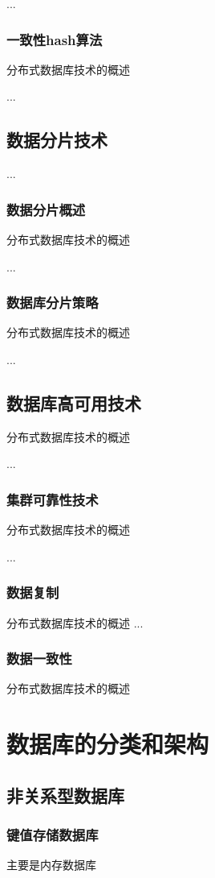 ...
\subsubsection*{一致性hash算法}
分布式数据库技术的概述

...
\subsection*{数据分片技术}
...
\subsubsection*{数据分片概述}
分布式数据库技术的概述

...
\subsubsection*{数据库分片策略}
分布式数据库技术的概述

...
\subsection*{数据库高可用技术}
分布式数据库技术的概述

...
\subsubsection*{集群可靠性技术}
分布式数据库技术的概述

...
\subsubsection*{数据复制}
分布式数据库技术的概述
...
\subsubsection*{数据一致性}
分布式数据库技术的概述
\section*{数据库的分类和架构}

\subsection*{非关系型数据库}

\subsubsection*{键值存储数据库}
主要是内存数据库

